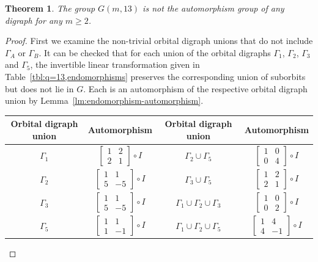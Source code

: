 \documentclass[10pt]{amsart}
\theoremstyle{definition}
\theoremstyle{plain}
\theoremstyle{plain}
\theoremstyle{plain}
\newtheorem{theorem}[theorem]{Theorem}
\theoremstyle{plain}
\begin{document}
\begin{theorem} \label{thm:q=13}
The group $G{\left(m, 13 \right)}$ is not the automorphism group of any digraph for any $m \geqslant 2$.
\end{theorem}
\begin{proof}
First we examine the non-trivial orbital digraph unions that do not include $\Gamma_A$ or $\Gamma_B$. It can be checked that for each union of the orbital digraphs $\Gamma_1$, $\Gamma_2$, $\Gamma_3$ and $\Gamma_5$, the invertible linear transformation given in Table~\ref{tbl:q=13,endomorphisms} preserves the corresponding union of suborbits but does not lie in $G$. Each is an automorphism of the respective orbital digraph union by Lemma~\ref{lm:endomorphism-automorphism}.

\begin{table}
\centering
\begin{tabular}{cc||cc}
\hline
Orbital digraph union & Automorphism & Orbital digraph union & Automorphism \\
\hline
\vphantom{\Bigg(} $\Gamma_1$ & $\begin{bmatrix} 1 & 2 \\ 2 & 1 \end{bmatrix} \circ I$ & $\Gamma_2 \cup \Gamma_5$ & $\begin{bmatrix} 1 & 0 \\ 0 & 4 \end{bmatrix} \circ I$ \\
\vphantom{\Bigg(} $\Gamma_2$ & $\begin{bmatrix} 1 & 1 \\ 5 & -5 \end{bmatrix} \circ I$ & $\Gamma_3 \cup \Gamma_5$ & $\begin{bmatrix} 1 & 2 \\ 2 & 1 \end{bmatrix} \circ I$ \\
\vphantom{\Bigg(} $\Gamma_3$ & $\begin{bmatrix} 1 & 1 \\ 5 & -5 \end{bmatrix} \circ I$ & $\Gamma_1 \cup \Gamma_2 \cup \Gamma_3$ & $\begin{bmatrix} 1 & 0 \\ 0 & 2 \end{bmatrix} \circ I$ \\
\vphantom{\Bigg(} $\Gamma_5$ & $\begin{bmatrix} 1 & 1 \\ 1 & -1 \end{bmatrix} \circ I$ & $\Gamma_1 \cup \Gamma_2 \cup \Gamma_5$ & $\begin{bmatrix} 1 & 4 \\ 4 & -1 \end{bmatrix} \circ I$ \\

\end{tabular}
\end{table}
\end{proof}
\end{document}
